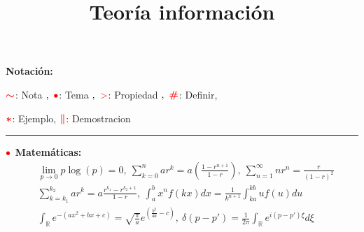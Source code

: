 \documentclass[%
 reprint,
 amsmath,amssymb,
 aps,
]{revtex4-1}
\begin{document}

\newcommand{\alfabeto}{\mathcal{A}_X}

\newcommand{\propiedad}{\textcolor{red}{\mathbf{>}}}
\newcommand{\definir}{\color{red}{\textbf{\#}}}
\newcommand{\tema}{\color{red}{\bullet}}
\newcommand{\nota}{\textcolor{red}{\color{red}{\boldsymbol{\sim}}}}
\newcommand{\ejemplo}{\textcolor{red}{\color{red}{\boldsymbol{*}}}}
\newcommand{\demo}{\textcolor{red}{\color{red}{\boldsymbol{\|}}}}


\newcommand*\sepline{%
  \rule[0.7ex]{.5\textwidth}{.5pt}}


\title{Teoría información}%


\maketitle

\textbf{Notación:}

$\nota$: Nota
$,\ \tema$: Tema
$,\ \propiedad$: Propiedad
$,\ \definir$: Definir,

$\ejemplo$: Ejemplo, $\demo$: Demostracion

\sepline

\textbf{$\tema$ Matemáticas:}
$$
\begin{aligned}
&\lim _{p \rightarrow 0} p \log (p)=0, \ \sum_{k=0}^{n} a r^{k}=a\left(\frac{1-r^{n+1}}{1-r}\right), \
\sum_{n=1}^{\infty} n r^{n} =\frac{r}{(1-r)^{2}} \\ 
&\sum_{k=k_1}^{k_2} ar^k
=a \frac{r^{k_1} - r^{k_2 + 1}}{1-r}, 
\
\int_{a}^{b} x^n f(kx) dx = \frac{1}{k^{n+1}} \int_{ka}^{kb} u f(u) du
\\
%                 
&\int_{\mathbb{R}} e^{- (ax^2 + bx + c )} = \sqrt{\frac{\pi}{a}} e^{ ( \frac{b^2}{4a} - c )}
,\
\delta (p -p') = \frac{1}{2\pi} \int_{\mathbb{R}} e^{i(p-p')\xi} d\xi
\end{aligned}
$$
\end{document}
